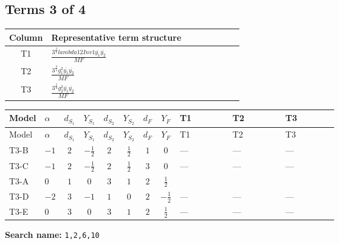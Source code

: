 \documentclass[8pt]{article}
\begin{document}
\begin{landscape}
\subsection*{Terms 3 of 4}
\begin{center}
\begin{tabular}{@{}c >{\raggedright\arraybackslash}p{0.82\linewidth}@{}}
\toprule
Column & Representative term structure \\
\midrule
T1 & \(\displaystyle \frac{3^{\frac{3}{4}} lambda12Inv1 \overline{y_{1}} \overline{y_{2}}}{MF}\) \\
\midrule
T2 & \(\displaystyle \frac{3^{\frac{3}{4}} g_{1}^{2} \overline{y_{1}} \overline{y_{2}}}{MF}\) \\
\midrule
T3 & \(\displaystyle \frac{3^{\frac{3}{4}} g_{2}^{2} \overline{y_{1}} \overline{y_{2}}}{MF}\) \\
\midrule
\bottomrule
\end{tabular}
\end{center}
\smallskip
\tiny
\begin{longtable}{@{}llcccccc >{\raggedright\arraybackslash}p{0.21\linewidth} >{\raggedright\arraybackslash}p{0.21\linewidth} >{\raggedright\arraybackslash}p{0.21\linewidth}@{}}
\toprule
Model & $\alpha$ & $d_{S_1}$ & $Y_{S_1}$ & $d_{S_2}$ & $Y_{S_2}$ & $d_F$ & $Y_F$ & T1 & T2 & T3 \\
\midrule
\endfirsthead
\toprule
Model & $\alpha$ & $d_{S_1}$ & $Y_{S_1}$ & $d_{S_2}$ & $Y_{S_2}$ & $d_F$ & $Y_F$ & T1 & T2 & T3 \\
\midrule
\endhead
T3-B & $-1$ & $2$ & $-\frac{1}{2}$ & $2$ & $\frac{1}{2}$ & $1$ & $0$ & --- & --- & --- \\
\midrule
T3-C & $-1$ & $2$ & $-\frac{1}{2}$ & $2$ & $\frac{1}{2}$ & $3$ & $0$ & --- & --- & --- \\
\midrule
T3-A & $0$ & $1$ & $0$ & $3$ & $1$ & $2$ & $\frac{1}{2}$ & \scriptsize\adjustbox{max width=\linewidth}{$\begin{gathered} \frac{3^{\frac{3}{4}} lambda12Inv1 \overline{y_{1}} \overline{y_{2}}}{6 MF}\end{gathered}$} & \scriptsize\adjustbox{max width=\linewidth}{$\begin{gathered} \frac{3^{\frac{3}{4}} g_{1}^{2} \overline{y_{1}} \overline{y_{2}}}{8 MF}\end{gathered}$} & \scriptsize\adjustbox{max width=\linewidth}{$\begin{gathered} \frac{25 \cdot 3^{\frac{3}{4}} g_{2}^{2} \overline{y_{1}} \overline{y_{2}}}{24 MF}\end{gathered}$} \\
\midrule
T3-D & $-2$ & $3$ & $-1$ & $1$ & $0$ & $2$ & $-\frac{1}{2}$ & --- & --- & --- \\
\midrule
T3-E & $0$ & $3$ & $0$ & $3$ & $1$ & $2$ & $\frac{1}{2}$ & --- & --- & --- \\
\midrule
\bottomrule
\end{longtable}
\clearpage
\noindent\textbf{Search name: }\texttt{1,2,6,10}\par\smallskip

\end{landscape}
\end{document}
